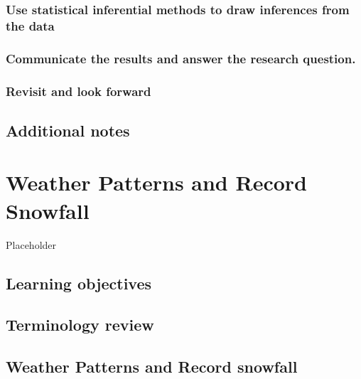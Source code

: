 \documentclass[
]{report}
\begin{document}
\hypertarget{use-statistical-inferential-methods-to-draw-inferences-from-the-data}{%
\subsection{Use statistical inferential methods to draw inferences from the data}\label{use-statistical-inferential-methods-to-draw-inferences-from-the-data}}

\hypertarget{communicate-the-results-and-answer-the-research-question.}{%
\subsection{Communicate the results and answer the research question.}\label{communicate-the-results-and-answer-the-research-question.}}

\hypertarget{revisit-and-look-forward}{%
\subsection{Revisit and look forward}\label{revisit-and-look-forward}}

\hypertarget{additional-notes}{%
\section{Additional notes}\label{additional-notes}}

\hypertarget{weather-patterns-and-record-snowfall}{%
\chapter{Weather Patterns and Record Snowfall}\label{weather-patterns-and-record-snowfall}}

Placeholder

\hypertarget{learning-objectives}{%
\section{Learning objectives}\label{learning-objectives}}

\hypertarget{terminology-review}{%
\section{Terminology review}\label{terminology-review}}

\hypertarget{weather-patterns-and-record-snowfall-1}{%
\section{Weather Patterns and Record snowfall}\label{weather-patterns-and-record-snowfall-1}}
\end{document}
